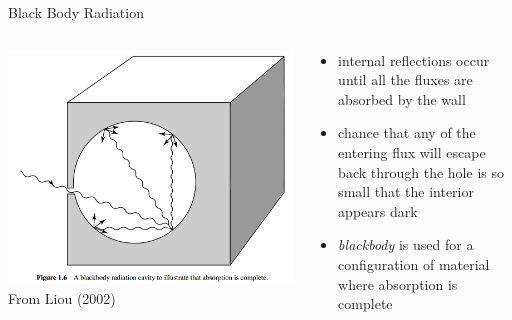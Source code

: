 \begin{frame}{Black Body Radiation}
\begin{columns}[T]
    \begin{column}{.4\textwidth}
    \begin{minipage}[c][0.8\textheight][c]{\linewidth}
    \includegraphics[width=1\textwidth]{fig13.png}\\
    \centering \small From Liou (2002)
    \end{minipage}
    \end{column}
    \begin{column}{.6\textwidth}
    \begin{minipage}[c][0.8\textheight][c]{\linewidth}
   \begin{itemize}
   	\item internal reflections occur until all the fluxes are absorbed by the wall
   	\item chance that any of the entering flux will escape back through the hole is so small that the interior appears dark
   	\item \textit{blackbody} is used for a configuration of material where absorption is complete
   \end{itemize}
      \end{minipage}
    \end{column}
  \end{columns} 
\end{frame}

